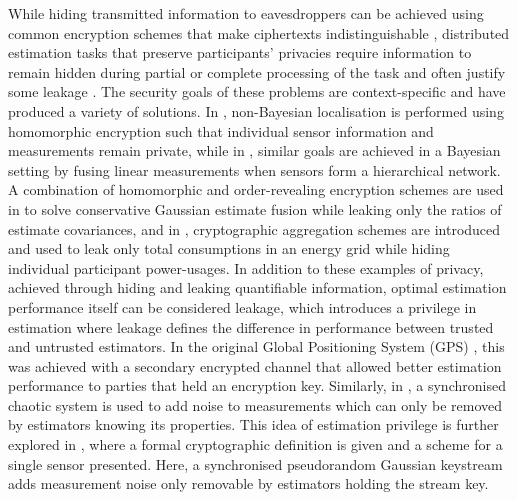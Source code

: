 \documentclass[conference]{IEEEtran}
\theoremstyle{definition}
\theoremstyle{remark}
\begin{document}
While hiding transmitted information to eavesdroppers can be achieved using common encryption schemes that make ciphertexts indistinguishable \cite{katzIntroductionModernCryptography2008}, distributed estimation tasks that preserve participants' privacies require information to remain hidden during partial or complete processing of the task and often justify some leakage \cite{risticSecureFastCovariance2021,shiPrivacyPreservingAggregationTimeSeries2011}. The security goals of these problems are context-specific and have produced a variety of solutions. In \cite{alanwarPrOLocResilientLocalization2017}, non-Bayesian localisation is performed using homomorphic encryption such that individual sensor information and measurements remain private, while in \cite{aristovEncryptedMultisensorInformation2018}, similar goals are achieved in a Bayesian setting by fusing linear measurements when sensors form a hierarchical network. A combination of homomorphic and order-revealing encryption schemes are used in \cite{risticSecureFastCovariance2021} to solve conservative Gaussian estimate fusion while leaking only the ratios of estimate covariances, and in \cite{shiPrivacyPreservingAggregationTimeSeries2011,joyeScalableSchemePrivacyPreserving2013}, cryptographic aggregation schemes are introduced and used to leak only total consumptions in an energy grid while hiding individual participant power-usages. In addition to these examples of privacy, achieved through hiding and leaking quantifiable information, optimal estimation performance itself can be considered leakage, which introduces a privilege in estimation where leakage defines the difference in performance between trusted and untrusted estimators. In the original Global Positioning System (GPS) \cite{grovesPrinciplesGNSSInertial2015}, this was achieved with a secondary encrypted channel that allowed better estimation performance to parties that held an encryption key. Similarly, in \cite{murguiaInformationTheoreticPrivacyChaos2020}, a synchronised chaotic system is used to add noise to measurements which can only be removed by estimators knowing its properties. This idea of estimation privilege is further explored in \cite{risticCryptographicallyPrivilegedState2022}, where a formal cryptographic definition is given and a scheme for a single sensor presented. Here, a synchronised pseudorandom Gaussian keystream adds measurement noise only removable by estimators holding the stream key.
\end{document}
